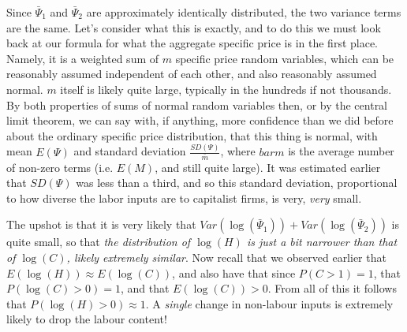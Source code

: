 Since $\bar{\Psi}_1$ and $\bar{\Psi}_2$ are approximately identically distributed, the two variance terms are the same. Let's consider what this is exactly, and to do this we must look back at our formula for what the aggregate specific price is in the first place. Namely, it is a weighted sum of $m$ specific price random variables, which can be reasonably assumed independent of each other, and also reasonably assumed normal. $m$ itself is likely quite large, typically in the hundreds if not thousands. By both properties of sums of normal random variables then, or by the central limit theorem, we can say with, if anything, more confidence than we did before about the ordinary specific price distribution, that this thing is normal, with mean $E(\Psi)$ and standard deviation $\frac{SD(\Psi)}{\bar{m}}$, where $bar{m}$ is the average number of non-zero terms (i.e. $E(M)$, and still quite large). It was estimated earlier that $SD(\Psi)$ was less than a third, and so this standard deviation, proportional to how diverse the labor inputs are to capitalist firms, is very, \textit{very} small. \par 
The upshot is that it is very likely that $Var(\log(\bar{\Psi}_1)) + Var(\log(\bar{\Psi}_2))$ is quite small, so that \textit{the distribution of $\log(H)$ is just a bit narrower than that of $\log(C)$, likely extremely similar}. Now recall that we observed earlier that $E(\log(H)) \approx E(\log(C))$, and also have that since $P(C > 1) = 1$, that $P(\log(C) > 0) = 1$, and that $E(\log(C)) > 0$. From all of this it follows that $P(\log(H) > 0) \approx 1$. A \textit{single} change in non-labour inputs is extremely likely to drop the labour content! 
